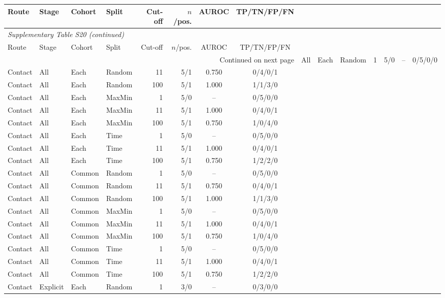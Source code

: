 \begin{longtable}{llllrrcc}

\toprule Route & Stage & Cohort & Split & Cut-off & $n$/pos. & AUROC & TP/TN/FP/FN \\ \midrule\endfirsthead

\multicolumn{8}{l}{\textit{Supplementary Table S20 (continued)}} \\

\toprule Route & Stage & Cohort & Split & Cut-off & $n$/pos. & AUROC & TP/TN/FP/FN \\ \midrule\endhead

\midrule\multicolumn{8}{r}{Continued on next page}\endfoot\bottomrule\endlastfoot

Contact & All & Each & Random & 1 & 5/0 & -- & 0/5/0/0 \\
Contact & All & Each & Random & 11 & 5/1 & 0.750 & 0/4/0/1 \\
Contact & All & Each & Random & 100 & 5/1 & 1.000 & 1/1/3/0 \\
Contact & All & Each & MaxMin & 1 & 5/0 & -- & 0/5/0/0 \\
Contact & All & Each & MaxMin & 11 & 5/1 & 1.000 & 0/4/0/1 \\
Contact & All & Each & MaxMin & 100 & 5/1 & 0.750 & 1/0/4/0 \\
Contact & All & Each & Time & 1 & 5/0 & -- & 0/5/0/0 \\
Contact & All & Each & Time & 11 & 5/1 & 1.000 & 0/4/0/1 \\
Contact & All & Each & Time & 100 & 5/1 & 0.750 & 1/2/2/0 \\
Contact & All & Common & Random & 1 & 5/0 & -- & 0/5/0/0 \\
Contact & All & Common & Random & 11 & 5/1 & 0.750 & 0/4/0/1 \\
Contact & All & Common & Random & 100 & 5/1 & 1.000 & 1/1/3/0 \\
Contact & All & Common & MaxMin & 1 & 5/0 & -- & 0/5/0/0 \\
Contact & All & Common & MaxMin & 11 & 5/1 & 1.000 & 0/4/0/1 \\
Contact & All & Common & MaxMin & 100 & 5/1 & 0.750 & 1/0/4/0 \\
Contact & All & Common & Time & 1 & 5/0 & -- & 0/5/0/0 \\
Contact & All & Common & Time & 11 & 5/1 & 1.000 & 0/4/0/1 \\
Contact & All & Common & Time & 100 & 5/1 & 0.750 & 1/2/2/0 \\
Contact & Explicit & Each & Random & 1 & 3/0 & -- & 0/3/0/0 \\

\end{longtable}
